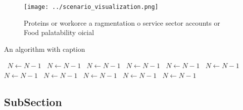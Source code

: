 \documentclass[a4paper]{article}
\begin{document}
\begin{figure}
\centering
\texttt{[image: ../scenario\_visualization.png]}
\caption{Proteins or workorce a ragmentation o service sector accounts or Food palatability oicial
}
\end{figure}
 
\begin{algorithm}
\caption{An algorithm with caption}
\begin{algorithmic}
\    \State $N \gets N - 1$
\    \State $N \gets N - 1$
\    \State $N \gets N - 1$
\    \State $N \gets N - 1$
\    \State $N \gets N - 1$
\    \State $N \gets N - 1$
\    \State $N \gets N - 1$
\    \State $N \gets N - 1$
\    \State $N \gets N - 1$
\    \State $N \gets N - 1$
\    \State $N \gets N - 1$
\EndWhile
\end{algorithmic}
\end{algorithm}

\subsection{SubSection}
\end{document}
